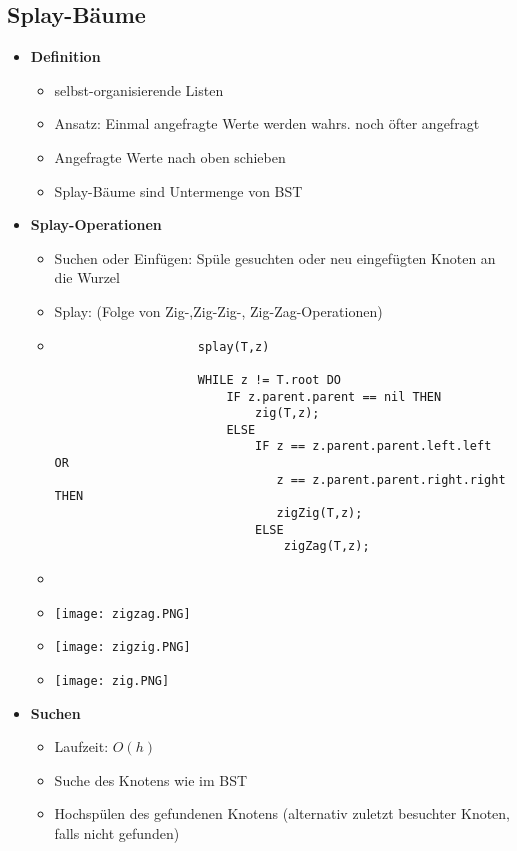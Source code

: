 \subsection{Splay-Bäume}
    \begin{itemize}
        \item \textbf{Definition}
            \begin{itemize}
                \item selbst-organisierende Listen
                \item Ansatz: Einmal angefragte Werte werden wahrs. noch öfter angefragt
                \item Angefragte Werte nach oben schieben
                \item Splay-Bäume sind Untermenge von BST
            \end{itemize}
        
        \item \textbf{Splay-Operationen}
            \begin{itemize}
                \item Suchen oder Einfügen: Spüle gesuchten oder neu eingefügten Knoten an die Wurzel
                \item Splay: (Folge von Zig-,Zig-Zig-, Zig-Zag-Operationen)
                \item []
                    \begin{verbatim}
                    splay(T,z)

                    WHILE z != T.root DO
                        IF z.parent.parent == nil THEN
                            zig(T,z);
                        ELSE
                            IF z == z.parent.parent.left.left OR
                               z == z.parent.parent.right.right THEN
                               zigZig(T,z);
                            ELSE
                                zigZag(T,z);
                    \end{verbatim}
                \item[]
                \item[] \texttt{[image: zigzag.PNG]}
                \item[] \texttt{[image: zigzig.PNG]}
                \item[] \texttt{[image: zig.PNG]}
            \end{itemize}
        
        \item \textbf{Suchen}
            \begin{itemize}
                \item Laufzeit: $O(h)$
                \item Suche des Knotens wie im BST
                \item Hochspülen des gefundenen Knotens (alternativ zuletzt besuchter Knoten, falls nicht gefunden)
            \end{itemize}


\end{itemize}
